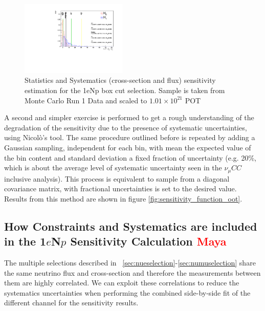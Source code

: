 \documentclass[a4paper]{article}
\newcommand{\numucc}{$\nu_{\mu} CC$ }
\begin{document}
\begin{figure}[H]
\begin{center}
\includegraphics[width=0.45\textwidth]{Sensitivity/SBNfit_Cls_nue_reco_e_genietune_run1_LEE_syst.pdf}
\caption{\label{fig:1eNp:box:statsystsensitivity} Statistics and Systematics (cross-section and flux) sensitivity estimation for the 1eNp box cut selection. Sample is taken from Monte Carlo Run 1 Data and scaled to $1.01\times10^21$ POT}
\end{center}
\end{figure}

A second and simpler exercise is performed to get a rough understanding of the degradation of the sensitivity due to the presence of systematic uncertainties, using Nicol\`o's tool.
The same procedure outlined before is repeated by adding a Gaussian sampling, independent for each bin, with mean the expected value of the bin content and standard deviation a fixed fraction of uncertainty (e.g. 20\%, which is about the average level of systematic uncertainty seen in the \numucc inclusive analysis).
This process is equivalent to sample from a diagonal covariance matrix, with fractional uncertainties is set to the desired value.
Results from this method are shown in figure \ref{fig:sensitivity_function_oot}.

\subsection{How Constraints and Systematics are included in the 1$e$N$p$ Sensitivity Calculation \textcolor{red}{Maya}}

The multiple selections described in  ~\ref{sec:nueselection}-\ref{sec:numuselection} share the same neutrino flux and cross-section and therefore the measurements between them are highly correlated. We can exploit these correlations to reduce the systematics uncertainties when performing the combined side-by-side fit of the different channel for the sensitivity results.
\end{document}
